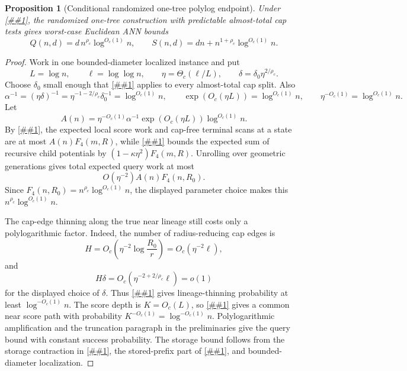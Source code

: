 \documentclass[10pt]{article}
\newcommand{\cref}[1]{\ref{##1}}
\newtheorem{proposition}[theorem]{Proposition}
\theoremstyle{definition}
\begin{document}
\begin{proposition}[Conditional randomized one-tree polylog endpoint]\label{prop:randomized-polylog}
   Under \cref{asm:mixed-continuation-operator}, the randomized one-tree construction with predictable almost-total cap tests gives worst-case Euclidean ANN bounds
   \[
      Q(n,d)=d\,n^{\rho_c}\log^{O_c(1)}n,
      \qquad
      S(n,d)=dn+n^{1+\rho_c}\log^{O_c(1)}n.
   \]
\end{proposition}

\begin{proof}
   Work in one bounded-diameter localized instance and put
   \[
      L=\log n,
      \qquad
      \ell=\log\log n,
      \qquad
      \eta=\Theta_c(\ell/L),
      \qquad
      \delta=\delta_0\eta^{2/\rho_c}.
   \]
   Choose $\delta_0$ small enough that \cref{lem:thin-cap-contraction} applies to every almost-total cap split. Also
   \[
      \alpha^{-1}=(\eta\delta)^{-1}=\eta^{-1-2/\rho_c}\delta_0^{-1}=\log^{O_c(1)}n,
      \qquad
      \exp(O_c(\eta L))=\log^{O_c(1)}n,
      \qquad
      \eta^{-O_c(1)}=\log^{O_c(1)}n.
   \]
   Let
   \[
      A(n)=\eta^{-O_c(1)}\alpha^{-1}\exp(O_c(\eta L))\log^{O_c(1)}n.
   \]
   By \cref{lem:cap-free-scan-accounting}, the expected local score work and cap-free terminal scans at a state are at most $A(n)F_4(m,R)$, while \cref{asm:mixed-continuation-operator} bounds the expected sum of recursive child potentials by $(1-\kappa\eta^2)F_4(m,R)$. Unrolling over geometric generations gives total expected query work at most
   \[
      O(\eta^{-2})A(n)F_4(n,R_0).
   \]
   Since $F_4(n,R_0)=n^{\rho_c}\log^{O_c(1)}n$, the displayed parameter choice makes this $n^{\rho_c}\log^{O_c(1)}n$.

   The cap-edge thinning along the true near lineage still costs only a polylogarithmic factor. Indeed, the number of radius-reducing cap edges is
   \[
      H=O_c\!\left(\eta^{-2}\log\frac{R_0}{r}\right)
      =
      O_c(\eta^{-2}\ell),
   \]
   and
   \[
      H\delta=O_c(\eta^{-2+2/\rho_c}\ell)=o(1)
   \]
   for the displayed choice of $\delta$. Thus \cref{lem:thin-lineage} gives lineage-thinning probability at least $\log^{-O_c(1)}n$. The score depth is $K=O_c(L)$, so \cref{lem:adaptive-continuation} gives a common near score path with probability $K^{-O_c(1)}=\log^{-O_c(1)}n$. Polylogarithmic amplification and the truncation paragraph in the preliminaries give the query bound with constant success probability. The storage bound follows from the storage contraction in \cref{lem:thin-cap-contraction}, the stored-prefix part of \cref{lem:adaptive-continuation}, and bounded-diameter localization.
\end{proof}
\end{document}
